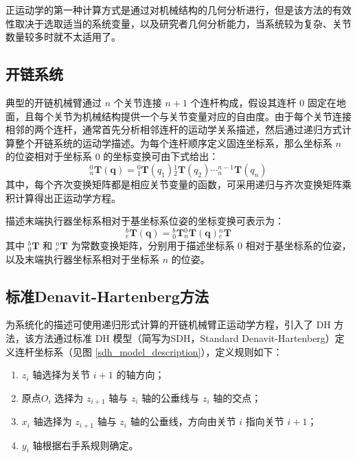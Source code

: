 \documentclass[cn,11pt,chinese,blue,bibstyle=ieeetr]{elegantbook}
\begin{document}
正运动学的第一种计算方式是通过对机械结构的几何分析进行，但是该方法的有效性取决于选取适当的系统变量，以及研究者几何分析能力，当系统较为复杂、关节数量较多时就不太适用了。


\subsection{开链系统}

典型的开链机械臂通过 $n$ 个关节连接 $n+1$ 个连杆构成，假设其连杆 $0$ 固定在地面，且每个关节为机械结构提供一个与关节变量对应的自由度。由于每个关节连接相邻的两个连杆，通常首先分析相邻连杆的运动学关系描述，然后通过递归方式计算整个开链系统的运动学描述。为每个连杆顺序定义固连坐标系，那么坐标系 $n$ 的位姿相对于坐标系 $0$ 的坐标变换可由下式给出：
\begin{equation}\label{link_forward_coordinate_transformation}
{_n^0\bm{T}}\left(\bm{q}\right) = {_1^0\bm{T}}\left(q_1\right){_2^1\bm{T}}\left(q_2\right)\cdots{_n^{n-1}\bm{T}}\left(q_n\right)
\end{equation}
其中，每个齐次变换矩阵都是相应关节变量的函数，可采用递归与齐次变换矩阵乘积计算得出正运动学方程。

描述末端执行器坐标系相对于基坐标系位姿的坐标变换可表示为：
\begin{equation}
{_e^b\bm{T}\left(\bm{q}\right)} = {_0^b\bm{T}}{_n^0\bm{T}\left(\bm{q}\right)}{_e^n\bm{T}}
\end{equation}
其中 $_0^b\bm{T}$ 和 $_e^n\bm{T}$ 为常数变换矩阵，分别用于描述坐标系 $0$ 相对于基坐标系的位姿，以及末端执行器坐标系相对于坐标系 $n$ 的位姿。


\subsection{标准Denavit-Hartenberg方法}

为系统化的描述可使用递归形式计算的开链机械臂正运动学方程，引入了 DH 方法，该方法通过标准 DH 模型（简写为SDH，Standard Denavit-Hartenberg）定义连杆坐标系（见图 \ref{sdh_model_description}），定义规则如下：

\begin{enumerate}
\item $z_i$ 轴选择为关节 $i+1$ 的轴方向；
\item 原点$O_i$ 选择为 $z_{i+1}$ 轴与 $z_i$ 轴的公垂线与 $z_i$ 轴的交点；
\item $x_i$ 轴选择为 $z_{i+1}$ 轴与 $z_i$ 轴的公垂线，方向由关节 $i$ 指向关节 $i+1$；
\item $y_i$ 轴根据右手系规则确定。
\end{enumerate}
\end{document}
